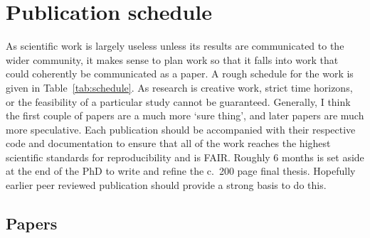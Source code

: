\documentclass[usenames, dvipsnames]{article}      %
\begin{document}
\section{Publication schedule}
\label{sec:pub}

As scientific work is largely useless unless its results are communicated 
to the wider community, it makes sense to plan work so that it 
falls into work that could coherently be communicated as a paper.
A rough schedule for the work is given in Table~\ref{tab:schedule}.
As research is creative work, strict time horizons, or the feasibility of 
a particular study cannot be guaranteed. Generally, I think the first
couple of papers are a much more `sure thing', and later papers 
are much more speculative.
Each publication should be accompanied with their respective code and 
documentation to ensure that all of the work reaches the 
highest scientific standards for reproducibility and is FAIR.
Roughly 6 months is set aside at the end of the PhD to 
write and refine the c.~200 page final thesis. 
Hopefully earlier peer reviewed publication should provide a strong
basis to do this.

\subsection{Papers}
\end{document}
